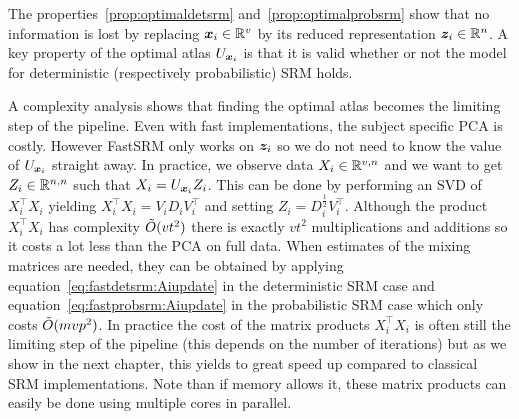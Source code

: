 The properties~\ref{prop:optimaldetsrm} and~\ref{prop:optimalprobsrm} show that
no information is lost by replacing $\boldsymbol{x}_i \in \mathbb{R}^v$ by its reduced representation $\boldsymbol{z}_i \in \mathbb{R}^n$.
A key property of the optimal atlas $U_{\boldsymbol{x}_i}$ is that it is valid whether or
not the model for deterministic (respectively probabilistic) SRM holds.

A complexity analysis shows that finding the optimal atlas becomes the limiting
step of the pipeline. Even with fast implementations, the subject specific PCA
is costly. However FastSRM only works on $\boldsymbol{z}_i$ so we do not need to know the value of $U_{\boldsymbol{x}_i}$ straight away.
In practice, we observe data $X_i \in \mathbb{R}^{v, n}$ and we want to get $Z_i
\in \mathbb{R}^{n, n}$ such that $X_i = U_{\boldsymbol{x}_i} Z_i$. This can be done by performing an
SVD of $X_i^{\top} X_i$ yielding $X_i^{\top}X_i= V_i D_i V_i^{\top}$ and setting $Z_i = D_i^{\frac12} V_i^{\top}$.
Although the product $X_i^{\top} X_i$ has complexity $\tilde{O}(vt^2)$ there is
exactly $vt^2$ multiplications and additions so it costs a lot less than the PCA
on full data. When estimates of the mixing matrices are needed, they can be obtained by
applying equation~\eqref{eq:fastdetsrm:Aiupdate} in the deterministic SRM case and
equation~\eqref{eq:fastprobsrm:Aiupdate} in the probabilistic SRM case which only costs
$\tilde{O}(mvp^2)$.
In practice the cost of the matrix products $X_i^{\top} X_i$ is often still the
limiting step of the pipeline (this depends on the number of iterations) but as
we show in the next chapter, this yields to great speed up compared to classical
SRM implementations. Note than if memory allows it, these matrix products can easily be done using multiple cores in parallel.



